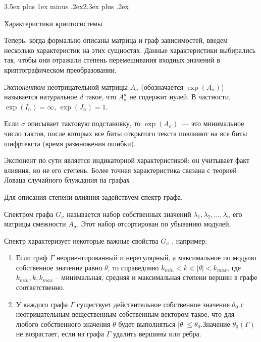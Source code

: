 \documentclass[a4paper,12pt]{report}
\makeatletter
\theoremstyle{plain} %
\theoremstyle{definition}
\theoremstyle{remark}
\renewcommand{\section}{\@startsection{section}{1}{18pt}%
{3.5ex plus 1ex minus .2ex}{2.3ex plus .2ex}%
{\normalfont\Large\bfseries\raggedright}}%
\makeatother
\begin{document}
\begin{large}
\section{Характеристики криптосистемы}

Теперь, когда формально описаны матрица и граф зависимостей, введем несколько характеристик на этих сущностях. Данные характеристики выбирались так, чтобы они отражали степень перемешивания входных значений в криптографическом преобразовании.

{\it Экспонентом} неотрицательной матрицы $A_\sigma$
(обозначается $\exp(A_\sigma)$)
называется натуральное $d$ такое, что 
$A_\sigma^d$ не содержит нулей.
В частности, $\exp(I_n)=\infty$, $\exp(J_n)=1$.

Если $\sigma$ описывает тактовую подстановку,
то $\exp(A_\sigma)$~--- это минимальное число тактов,
после которых все биты открытого текста повлияют 
на все биты шифртекста (время размножения ошибки).


Экспонент по сути является индикаторной характеристикой:
он учитывает факт влияния, но не его степень.
Более точная характеристика связана с теорией Ловаца
случайного блуждания на графах \cite{lovasz_walks}.

Для описания степени влияния задействуем спектр графа.

Спектром графа $G_{\sigma}$ называется набор собственных значений $\lambda_1, \lambda_2,...,\lambda_n$ его матрицы смежности $A_{\sigma}$. Этот набор отсортирован по убыванию модулей. 

Спектр характеризует некоторые важные свойства $G_{\sigma}$ \cite{lovasz_eigenvalues}, например:

\begin{enumerate}

\item Если граф $\Gamma$ неориентированный и нерегулярный, а максимальное по модулю собственное значение равно $\theta$, то справедливо $k_{min} < \overline{k} < |\theta| < k_{max}$, где $k_{min}, \overline{k}, k_{max}$ --  минимальная, средняя и максимальная степени вершин в графе соответственно.

\item У каждого графа $\Gamma$ существует действительное собственное значение $\theta_0$ с неотрицательным вещественным собственным вектором такое, что для любого собственного значения $\theta$ будет выполняться $|\theta| \leq \theta_0$.Значение $\theta_0(\Gamma)$ не возрастает, если из графа $\Gamma$ удалить вершины или ребра.


\end{enumerate}
\end{large}
\end{document}
